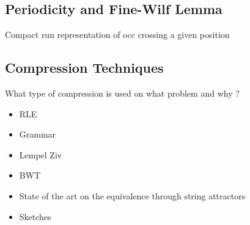 \subsection{Periodicity and Fine-Wilf Lemma}\label{sec:prelim:FW}
Compact run representation of occ crossing a given position


\subsection{Compression Techniques}
What type of compression is used on what problem and why ?
\begin{itemize}
\item RLE
\item Grammar
\item Lempel Ziv
\item BWT
\item State of the art on the equivalence through string attractors
\item Sketches
\end{itemize}